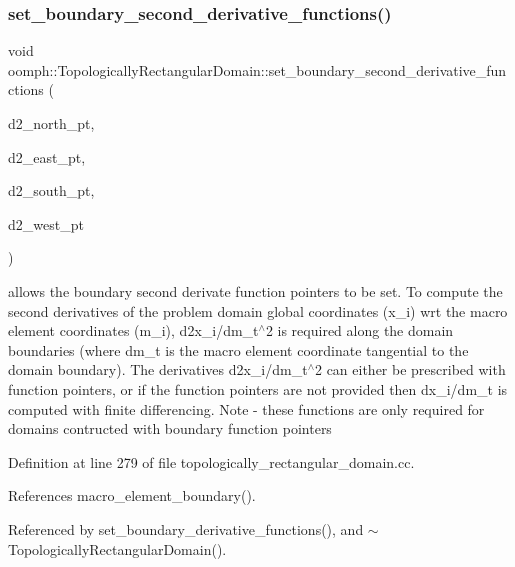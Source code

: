\subsubsection{\texorpdfstring{set\+\_\+boundary\+\_\+second\+\_\+derivative\+\_\+functions()}{set\_boundary\_second\_derivative\_functions()}}
{\footnotesize\ttfamily void oomph\+::\+Topologically\+Rectangular\+Domain\+::set\+\_\+boundary\+\_\+second\+\_\+derivative\+\_\+functions (\begin{DoxyParamCaption}\item[{\hyperlink{classoomph_1_1TopologicallyRectangularDomain_a8b2e24f5500d86c93aef509c5410e7cc}{Boundary\+Fct\+Pt}}]{d2\+\_\+north\+\_\+pt,  }\item[{\hyperlink{classoomph_1_1TopologicallyRectangularDomain_a8b2e24f5500d86c93aef509c5410e7cc}{Boundary\+Fct\+Pt}}]{d2\+\_\+east\+\_\+pt,  }\item[{\hyperlink{classoomph_1_1TopologicallyRectangularDomain_a8b2e24f5500d86c93aef509c5410e7cc}{Boundary\+Fct\+Pt}}]{d2\+\_\+south\+\_\+pt,  }\item[{\hyperlink{classoomph_1_1TopologicallyRectangularDomain_a8b2e24f5500d86c93aef509c5410e7cc}{Boundary\+Fct\+Pt}}]{d2\+\_\+west\+\_\+pt }\end{DoxyParamCaption})}



allows the boundary second derivate function pointers to be set. To compute the second derivatives of the problem domain global coordinates (x\+\_\+i) wrt the macro element coordinates (m\+\_\+i), d2x\+\_\+i/dm\+\_\+t$^\wedge$2 is required along the domain boundaries (where dm\+\_\+t is the macro element coordinate tangential to the domain boundary). The derivatives d2x\+\_\+i/dm\+\_\+t$^\wedge$2 can either be prescribed with function pointers, or if the function pointers are not provided then dx\+\_\+i/dm\+\_\+t is computed with finite differencing. Note -\/ these functions are only required for domains contructed with boundary function pointers 



Definition at line 279 of file topologically\+\_\+rectangular\+\_\+domain.\+cc.



References macro\+\_\+element\+\_\+boundary().



Referenced by set\+\_\+boundary\+\_\+derivative\+\_\+functions(), and $\sim$\+Topologically\+Rectangular\+Domain().



